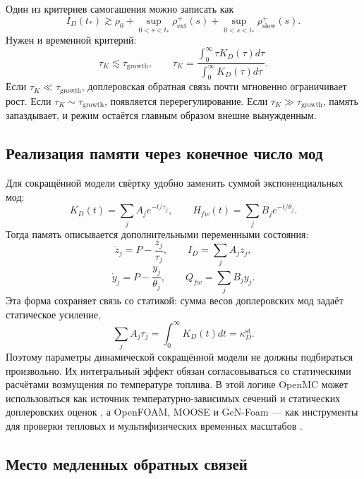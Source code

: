 \documentclass[12pt]{article}
\begin{document}
Один из критериев самогашения можно записать как
\[
\boxed{
I_D(t_*)
\gtrsim
\rho_0+
\sup_{0<s<t_*}\rho_{\mathrm{ext}}^+(s)+
\sup_{0<s<t_*}\rho_{\mathrm{slow}}^+(s).
}
\]
Нужен и временной критерий:
\[
\tau_K\lesssim\tau_{\mathrm{growth}},
\qquad
\tau_K=
\frac{\int_0^\infty\tau K_D(\tau)d\tau}{\int_0^\infty K_D(\tau)d\tau}.
\]
Если \(\tau_K\ll\tau_{\mathrm{growth}}\), доплеровская обратная связь почти мгновенно ограничивает рост. Если \(\tau_K\sim\tau_{\mathrm{growth}}\), появляется перерегулирование. Если \(\tau_K\gg\tau_{\mathrm{growth}}\), память запаздывает, и режим остаётся главным образом внешне вынужденным.

\subsection{Реализация памяти через конечное число мод}

Для сокращённой модели свёртку удобно заменить суммой экспоненциальных мод:
\[
K_D(t)=\sum_jA_je^{-t/\tau_j},
\qquad
H_{fw}(t)=\sum_jB_je^{-t/\theta_j}.
\]
Тогда память описывается дополнительными переменными состояния:
\[
\dot z_j=P-\frac{z_j}{\tau_j},
\qquad
I_D=\sum_jA_jz_j,
\]
\[
\dot y_j=P-\frac{y_j}{\theta_j},
\qquad
Q_{fw}=\sum_jB_jy_j.
\]
Эта форма сохраняет связь со статикой: сумма весов доплеровских мод задаёт статическое усиление,
\[
\sum_jA_j\tau_j
=
\int_0^\infty K_D(t)dt
=
\kappa_D^{\mathrm{st}}.
\]
Поэтому параметры динамической сокращённой модели не должны подбираться произвольно. Их интегральный эффект обязан согласовываться со статическими расчётами возмущения по температуре топлива. В этой логике OpenMC может использоваться как источник температурно-зависимых сечений и статических доплеровских оценок \cite{OpenMCCrossSections}, а OpenFOAM, MOOSE и GeN-Foam --- как инструменты для проверки тепловых и мультифизических временных масштабов \cite{MOOSEHeatTransfer,OpenFOAMSolvers,GeNFoam2015}.

\subsection{Место медленных обратных связей}
\end{document}
